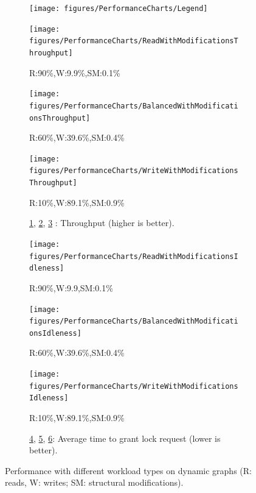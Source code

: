 \begin{figure}
	\centering
	\captionsetup{justification=centering}
		\begin{subfigure}[b]{\textwidth}
			\centering
			\texttt{[image: figures/PerformanceCharts/Legend]}
		\end{subfigure}
		\begin{subfigure}[b]{.33\textwidth}
			\texttt{[image: figures/PerformanceCharts/ReadWithModificationsThroughput]}
			\caption{R:90\%,W:9.9\%,SM:0.1\%}
			\label{rm}
		\end{subfigure}
		\begin{subfigure}[b]{.325\textwidth}
			\texttt{[image: figures/PerformanceCharts/BalancedWithModificationsThroughput]}
			\caption{R:60\%,W:39.6\%,SM:0.4\%}
			\label{bm}
		\end{subfigure}
		\begin{subfigure}[b]{.325\textwidth}
			\texttt{[image: figures/PerformanceCharts/WriteWithModificationsThroughput]}
			\caption{R:10\%,W:89.1\%,SM:0.9\%}
			\label{wm}
		\end{subfigure}
		\begin{subfigure}[b]{\textwidth}
			\caption*{\cref{rm}, \cref{bm}, \cref{wm} : Throughput (higher is better).}
		\end{subfigure}
	
	
	
		\begin{subfigure}[b]{.33\textwidth}
			\texttt{[image: figures/PerformanceCharts/ReadWithModificationsIdleness]}
			\caption{R:90\%,W:9.9,SM:0.1\%}
			\label{irm}
		\end{subfigure}
		\begin{subfigure}[b]{.325\textwidth}
			\texttt{[image: figures/PerformanceCharts/BalancedWithModificationsIdleness]}
			\caption{R:60\%,W:39.6\%,SM:0.4\%}
			\label{ibm}
		\end{subfigure}
		\begin{subfigure}[b]{.325\textwidth}
			\texttt{[image: figures/PerformanceCharts/WriteWithModificationsIdleness]}
			\caption{R:10\%,W:89.1\%,SM:0.9\%}
			\label{iwm}
		\end{subfigure}
		\begin{subfigure}[b]{\textwidth}
			\caption*{\cref{irm}, \cref{ibm}, \cref{iwm}: Average time to grant lock request  (lower is better).}
		\end{subfigure}
	
		\caption{Performance with different workload types on dynamic graphs  (R: reads, W: writes; SM: structural modifications).}
		\label{dynamicPerf}
	\end{figure}

